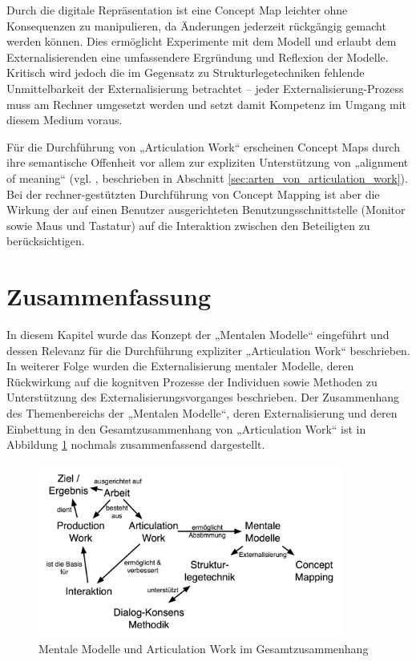 Durch die digitale Repräsentation ist eine Concept Map leichter ohne Konsequenzen zu manipulieren, da Änderungen jederzeit rückgängig gemacht werden können. Dies ermöglicht Experimente mit dem Modell und erlaubt dem Externalisierenden eine umfassendere Ergründung und Reflexion der Modelle. Kritisch wird jedoch die im Gegensatz zu Strukturlegetechniken fehlende Unmittelbarkeit der Externalisierung betrachtet – jeder Externalisierung-Prozess muss am Rechner umgesetzt werden und setzt damit Kompetenz im Umgang mit diesem Medium voraus. \citet[][S. 30f]{Ifenthaler06}

Für die Durchführung von „Articulation Work“ erscheinen Concept Maps durch ihre semantische Offenheit vor allem zur expliziten Unterstützung von „alignment of meaning“ (vgl. \citep{Sarini02}, beschrieben in Abschnitt \ref{sec:arten_von_articulation_work}). Bei der rechner-gestützten Durchführung von Concept Mapping ist aber die Wirkung der auf einen Benutzer ausgerichteten Benutzungsschnittstelle (Monitor sowie Maus und Tastatur) auf die Interaktion zwischen den Beteiligten zu berücksichtigen.



\section{Zusammenfassung} %
\label{sec:mentale_modelle_fazit}

In diesem Kapitel wurde das Konzept der „Mentalen Modelle“ eingeführt und dessen Relevanz für die Durchführung expliziter „Articulation Work“ beschrieben. In weiterer Folge wurden die Externalisierung mentaler Modelle, deren Rückwirkung auf die kognitven Prozesse der Individuen sowie Methoden zu Unterstützung des Externalisierungsvorganges beschrieben. Der Zusammenhang des Themenbereichs der „Mentalen Modelle“, deren Externalisierung und deren Einbettung in den Gesamtzusammenhang von „Articulation Work“ ist in Abbildung \ref{fig:img_MentaleModelle_ArbeitInteraktionMentaleModelle} nochmals zusammenfassend dargestellt.

\begin{figure}[htbp]
	\centering
		\includegraphics[width=10cm]{img/MentaleModelle/ArbeitInteraktionMentaleModelle.png}
	\caption{Mentale Modelle und Articulation Work im Gesamtzusammenhang}
	\label{fig:img_MentaleModelle_ArbeitInteraktionMentaleModelle}
\end{figure}


